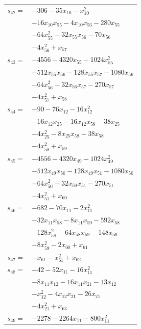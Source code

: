 \begin{longtable}{@{}r@{\;}l@{}}
\(s_{42}=\) & \(\displaystyle -306 -35x_{10} -x_{10}^{2}\) \\
 & \(\displaystyle -16x_{10}x_{55} -4x_{10}x_{56} -280x_{55}\) \\
 & \(\displaystyle -64x_{55}^{2} -32x_{55}x_{56} -70x_{56}\) \\
 & \(\displaystyle -4x_{56}^{2} +x_{57}\) \\[3pt]
\(s_{43}=\) & \(\displaystyle -4556 -4320x_{55} -1024x_{55}^{2}\) \\
 & \(\displaystyle -512x_{55}x_{56} -128x_{55}x_{57} -1080x_{56}\) \\
 & \(\displaystyle -64x_{56}^{2} -32x_{56}x_{57} -270x_{57}\) \\
 & \(\displaystyle -4x_{57}^{2} +x_{58}\) \\[3pt]
\(s_{44}=\) & \(\displaystyle -90 -76x_{12} -16x_{12}^{2}\) \\
 & \(\displaystyle -16x_{12}x_{25} -16x_{12}x_{58} -38x_{25}\) \\
 & \(\displaystyle -4x_{25}^{2} -8x_{25}x_{58} -38x_{58}\) \\
 & \(\displaystyle -4x_{58}^{2} +x_{59}\) \\[3pt]
\(s_{45}=\) & \(\displaystyle -4556 -4320x_{49} -1024x_{49}^{2}\) \\
 & \(\displaystyle -512x_{49}x_{50} -128x_{49}x_{51} -1080x_{50}\) \\
 & \(\displaystyle -64x_{50}^{2} -32x_{50}x_{51} -270x_{51}\) \\
 & \(\displaystyle -4x_{51}^{2} +x_{60}\) \\[3pt]
\(s_{46}=\) & \(\displaystyle -682 -70x_{11} -2x_{11}^{2}\) \\
 & \(\displaystyle -32x_{11}x_{58} -8x_{11}x_{59} -592x_{58}\) \\
 & \(\displaystyle -128x_{58}^{2} -64x_{58}x_{59} -148x_{59}\) \\
 & \(\displaystyle -8x_{59}^{2} -2x_{60} +x_{61}\) \\[3pt]
\(s_{47}=\) & \(\displaystyle -x_{61} -x_{61}^{2} +x_{62}\) \\[3pt]
\(s_{48}=\) & \(\displaystyle -42 -52x_{11} -16x_{11}^{2}\) \\
 & \(\displaystyle -8x_{11}x_{12} -16x_{11}x_{21} -13x_{12}\) \\
 & \(\displaystyle -x_{12}^{2} -4x_{12}x_{21} -26x_{21}\) \\
 & \(\displaystyle -4x_{21}^{2} +x_{63}\) \\[3pt]
\(s_{49}=\) & \(\displaystyle -2278 -2264x_{11} -800x_{11}^{2}\) \\

\end{longtable}
